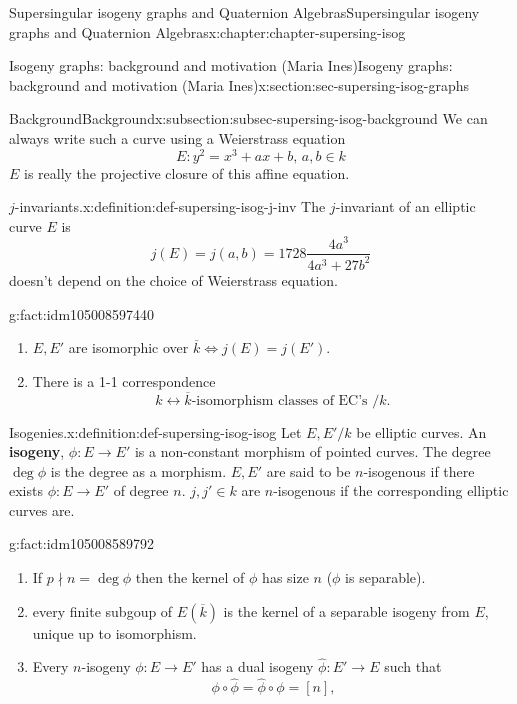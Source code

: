 \documentclass[oneside,10pt,]{book}
\newcommand{\terminology}[1]{\textbf{#1}}
\numberwithin{equation}{section}
\newcommand{\lb}{[}
\newcommand{\rb}{]}
\begin{document}
\begin{chapterptx}{Supersingular isogeny graphs and Quaternion Algebras}{}{Supersingular isogeny graphs and Quaternion Algebras}{}{}{x:chapter:chapter-supersing-isog}
\begin{sectionptx}{Isogeny graphs: background and motivation (Maria Ines)}{}{Isogeny graphs: background and motivation (Maria Ines)}{}{}{x:section:sec-supersing-isog-graphs}
\begin{subsectionptx}{Background}{}{Background}{}{}{x:subsection:subsec-supersing-isog-background}
We can always write such a curve using a Weierstrass equation%
\begin{equation*}
E\colon y^2=  x^3  + ax  +b,\,a,b    \in k
\end{equation*}
\(E\) is really the projective closure of this affine equation.%
\begin{definition}{\(j\)-invariants.}{x:definition:def-supersing-isog-j-inv}%
The \(j\)-invariant of an elliptic curve \(E\) is%
\begin{equation*}
j(E) = j(a,b) = 1728 \frac{4a^3}{4a^3 + 27b^2}
\end{equation*}
doesn't depend on the choice of Weierstrass equation.%
\end{definition}
\begin{fact}{}{}{g:fact:idm105008597440}%
%
\begin{enumerate}
\item{}\(E,E'\) are isomorphic over \(\overline k \iff j(E)  = j(E')\).%
\item{}There is a 1-1 correspondence%
\begin{equation*}
k \leftrightarrow \overline k \text{-isomorphism classes of EC's }/k\text{.}
\end{equation*}
%
\end{enumerate}
%
\end{fact}
\begin{definition}{Isogenies.}{x:definition:def-supersing-isog-isog}%
Let \(E,E'/k\) be elliptic curves. An \terminology{isogeny}, \(\phi \colon E\to E'\) is a non-constant morphism of pointed curves. The degree \(\deg \phi \) is the degree as a morphism. \(E,E'\) are said to be \(n\)-isogenous if there exists \(\phi\colon E\to E'\) of degree \(n\). \(j,j'\in k\) are \(n\)-isogenous if the corresponding elliptic curves are.%
\end{definition}
\begin{fact}{}{}{g:fact:idm105008589792}%
%
\begin{enumerate}
\item{}If \(p \nmid n = \deg \phi\) then the kernel of \(\phi\) has size \(n\) (\(\phi\) is separable).%
\item{}every finite subgoup of \(E(\overline k )\) is the kernel of a separable isogeny from \(E\), unique up to isomorphism.%
\item{}Every \(n\)-isogeny \(\phi\colon E \to E'\) has  a dual isogeny \(\hat \phi \colon E' \to E\) such that%
\begin{equation*}
\phi\circ \hat\phi = \hat\phi \circ \phi = \lb n \rb\text{,}

\end{equation*}
\end{enumerate}
\end{fact}
\end{subsectionptx}
\end{sectionptx}
\end{chapterptx}
\end{document}
